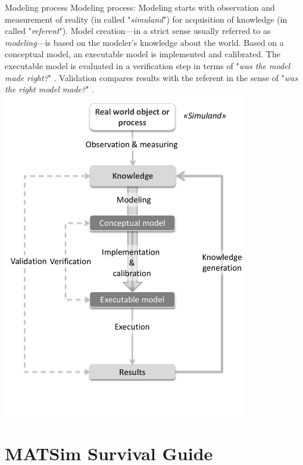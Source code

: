 \createfigure%
{Modeling process}%
{Modeling process: Modeling starts with observation and measurement of reality (in \citet[][]{Petty_SokolowskiBanks_2010} called "\emph{simuland}") for acquisition of knowledge (in \citet[][]{Petty_SokolowskiBanks_2010} called "\emph{referent}"). Model creation---in a strict sense usually referred to as \emph{modeling}---is based on the modeler's knowledge about the world. Based on a conceptual model, an executable model is implemented and calibrated. The executable model is evaluated in a verification step in terms of "\emph{was the model made right?}" \citep[][p.332]{Petty_SokolowskiBanks_2010}. Validation compares results with the referent in the sense of "\emph{was the right model made?}" \citep[][p.332]{Petty_SokolowskiBanks_2010}.}%
{\label{fig:modeling}}%
{\includegraphics[width=0.8\textwidth, angle=0]{using/figures/modeling.pdf}}%
{}

\section{MATSim Survival Guide}
\label{sec:survival}

